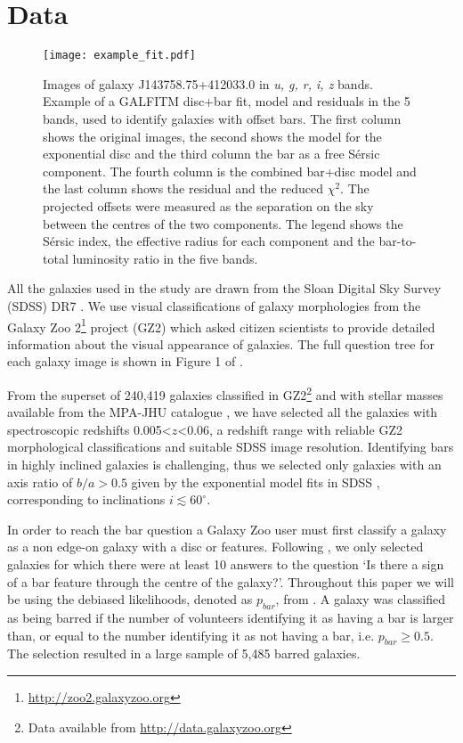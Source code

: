 \documentclass[a4paper,fleqn,usenatbib,useAMS]{mnras}
\begin{document}
\section{Data}

\begin{figure*}
 \texttt{[image: example\_fit.pdf]}
 \caption{Images of galaxy J143758.75+412033.0 in \textit{u, g, r, i, z} bands. Example of a GALFITM disc+bar fit, model and residuals in the 5 bands, used to identify galaxies with offset bars. The first column shows the original images, the second shows the model for the exponential disc and the third column the bar as a free S\'ersic component. The fourth column is the combined bar+disc model and the last column shows the residual and the reduced $\chi^2$. The projected offsets were measured as the separation on the sky between the centres of the two components. The legend shows the S\'ersic index, the effective radius for each component and the bar-to-total luminosity ratio in the five bands.}
 \label{example}
\end{figure*}

All the galaxies used in the study are drawn from the Sloan Digital Sky Survey (SDSS) DR7 \citep{SDSSDR7, Strauss2002}. We use visual classifications of galaxy morphologies from the Galaxy Zoo 2\footnote{\url{http://zoo2.galaxyzoo.org}} project (GZ2) \citep{Willett2013} which asked citizen scientists to provide detailed information about the visual appearance of galaxies. The full question tree for each galaxy image is shown in Figure 1 of \citet{Willett2013}. 

From the superset of 240,419 galaxies classified in GZ2\footnote{Data available from \url{http://data.galaxyzoo.org}} and with stellar masses available from the MPA-JHU catalogue \citep{Kauffmann2003a}, we have selected all the galaxies with spectroscopic redshifts 0.005<$z$<0.06, a redshift range with reliable GZ2 morphological classifications and suitable SDSS image resolution. Identifying bars in highly inclined galaxies is challenging, thus we selected only galaxies with an axis ratio of $b/a>0.5$ given by the exponential model fits in SDSS \citep{Stoughton2002}, corresponding to inclinations $i\lesssim60^{\circ}$.

In order to reach the bar question a Galaxy Zoo user must first classify a galaxy as a non edge-on galaxy with a disc or features. Following \citet{Masters2011}, we only selected galaxies for which there were at least 10 answers to the question `Is there a sign of a bar feature through the centre of the galaxy?'. Throughout this paper we will be using the debiased likelihoods, denoted as $p_{bar}$, from \citet{Willett2013}. A galaxy was classified as being barred if the number of volunteers identifying it as having a bar is larger than, or equal to the number identifying it as not having a bar, i.e. $p_{bar}\geq0.5$. The selection resulted in a large sample of 5,485 barred galaxies. 
\end{document}
